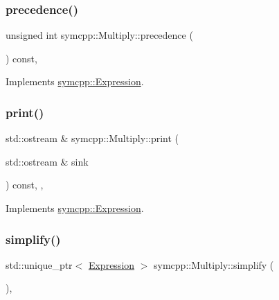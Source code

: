 \subsubsection{\texorpdfstring{precedence()}{precedence()}}
{\footnotesize\ttfamily unsigned int symcpp\+::\+Multiply\+::precedence (\begin{DoxyParamCaption}{ }\end{DoxyParamCaption}) const\hspace{0.3cm}{\ttfamily [override]}, {\ttfamily [virtual]}}



Implements \mbox{\hyperlink{classsymcpp_1_1Expression_a181c162d5740faac392ffdca26bfca0c}{symcpp\+::\+Expression}}.

\mbox{\label{classsymcpp_1_1Multiply_a8d6dbfc85d0609f40d52c0fc853a06b5}} 
\subsubsection{\texorpdfstring{print()}{print()}}
{\footnotesize\ttfamily std\+::ostream \& symcpp\+::\+Multiply\+::print (\begin{DoxyParamCaption}\item[{std\+::ostream \&}]{sink }\end{DoxyParamCaption}) const\hspace{0.3cm}{\ttfamily [override]}, {\ttfamily [private]}, {\ttfamily [virtual]}}



Implements \mbox{\hyperlink{classsymcpp_1_1Expression_af37e13032a40f2da4d2866eaa8658049}{symcpp\+::\+Expression}}.

\mbox{\label{classsymcpp_1_1Multiply_aff728e2edaa447f154918079b4e35a7e}} 
\subsubsection{\texorpdfstring{simplify()}{simplify()}}
{\footnotesize\ttfamily std\+::unique\+\_\+ptr$<$ \mbox{\hyperlink{classsymcpp_1_1Expression}{Expression}} $>$ symcpp\+::\+Multiply\+::simplify (\begin{DoxyParamCaption}{ }\end{DoxyParamCaption})\hspace{0.3cm}{\ttfamily [override]}, {\ttfamily [virtual]}}



